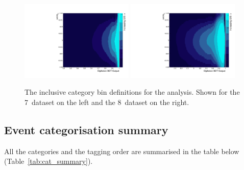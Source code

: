 \begin{figure}
  \includegraphics[width=0.48\textwidth]{ch4_selec_and_cats/plots/sideband_cats_7TeV.pdf}
  \includegraphics[width=0.48\textwidth]{ch4_selec_and_cats/plots/sideband_cats_8TeV.pdf}
  \caption{The inclusive category bin definitions for the \SMVA analysis. Shown for the 7~\TeV dataset on the left and the 8~\TeV dataset on the right.}
  \label{fig:sideband_cats}
\end{figure}

\subsection{Event categorisation summary}

All the categories and the tagging order are summarised in the table below (Table~\ref{tab:cat_summary}).

